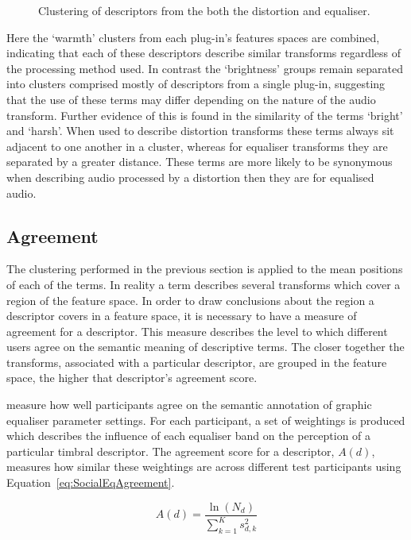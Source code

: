 \begin{figure}[h!]
{					\label{fig:CombinedDifferenceClusters}
				}
				\caption{Clustering of descriptors from the both the distortion and equaliser.}
				\label{fig:CombinedClusters}
			\end{figure}

			Here the `warmth' clusters from each plug-in's features spaces are combined, indicating that each
			of these descriptors describe similar transforms regardless of the processing method used. In
			contrast the `brightness' groups remain separated into clusters comprised mostly of descriptors
			from a single plug-in, suggesting that the use of these terms may differ depending on the nature of
			the audio transform.  Further evidence of this is found in the similarity of the terms `bright' and
			`harsh'.  When used to describe distortion transforms these terms always sit adjacent to one
			another in a cluster, whereas for equaliser transforms they are separated by a greater distance.
			These terms are more likely to be synonymous when describing audio processed by a distortion then
			they are for equalised audio. 

	\subsection{Agreement}
	\label{sec:TimbreEvaluation-Analysis-Agreement}
		The clustering performed in the previous section is applied to the mean positions of each of the terms. In
		reality a term describes several transforms which cover a region of the feature space. In order to draw
		conclusions about the region a descriptor covers in a feature space, it is necessary to have a measure of
		agreement for a descriptor. This measure describes the level to which different users agree on the semantic
		meaning of descriptive terms. The closer together the transforms, associated with a particular descriptor,
		are grouped in the feature space, the higher that descriptor's agreement score.

		\citet{cartwright2013socialeq} measure how well participants agree on the semantic annotation of graphic
		equaliser parameter settings. For each participant, a set of weightings is produced which describes the
		influence of each equaliser band on the perception of a particular timbral descriptor. The agreement score
		for a descriptor, $A(d)$, measures how similar these weightings are across different test participants
		using Equation~\ref{eq:SocialEqAgreement}.

		\begin{equation}
			A(d) = \frac{\ln(N_{d})}{\sum_{k = 1}^{K} s_{d,k}^{2}}
			\label{eq:SocialEqAgreement}
		\end{equation}

